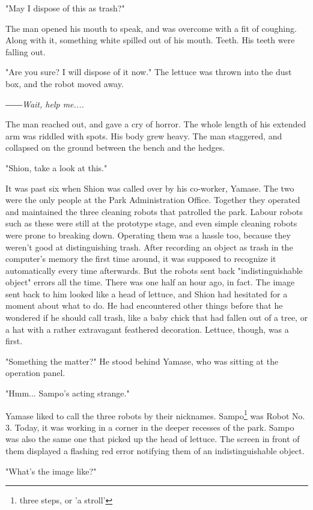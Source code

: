 "May I dispose of this as trash?"

The man opened his mouth to speak, and was overcome with a fit of
coughing. Along with it, something white spilled out of his mouth.
Teeth. His teeth were falling out.

"Are you sure? I will dispose of it now." The lettuce was thrown into
the dust box, and the robot moved away.

\emph{――Wait, help me....}

The man reached out, and gave a cry of horror. The whole length of his
extended arm was riddled with spots. His body grew heavy. The man
staggered, and collapsed on the ground between the bench and the hedges.

\myspace

"Shion, take a look at this."

It was past six when Shion was called over by his co-worker, Yamase. The
two were the only people at the Park Administration Office. Together
they operated and maintained the three cleaning robots that patrolled
the park. Labour robots such as these were still at the prototype stage,
and even simple cleaning robots were prone to breaking down. Operating
them was a hassle too, because they weren't good at distinguishing
trash. After recording an object as trash in the computer's memory the
first time around, it was supposed to recognize it automatically every
time afterwards. But the robots sent back "indistinguishable object"
errors all the time. There was one half an hour ago, in fact. The image
sent back to him looked like a head of lettuce, and Shion had hesitated
for a moment about what to do. He had encountered other things before
that he wondered if he should call trash, like a baby chick that had
fallen out of a tree, or a hat with a rather extravagant feathered
decoration. Lettuce, though, was a first.

"Something the matter?" He stood behind Yamase, who was sitting at the
operation panel.

"Hmm... Sampo's acting strange."

Yamase liked to call the three robots by their nicknames. Sampo\footnote{three steps, or 'a stroll'} was
Robot No. 3. Today, it was working in a corner in the deeper recesses of
the park. Sampo was also the same one that picked up the head of
lettuce. The screen in front of them displayed a flashing red error
notifying them of an indistinguishable object.

"What's the image like?"

